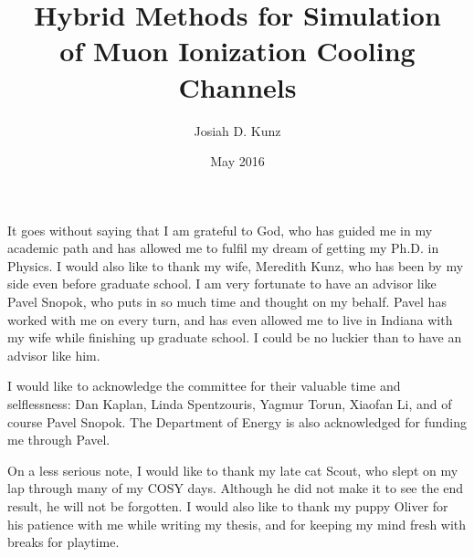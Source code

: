 \title{Hybrid Methods for Simulation\\
of Muon Ionization Cooling Channels}
\author{Josiah D. Kunz}
\date{May 2016}
\copyrightnoticefalse      %
\maketitle                %


\prelimpages         %


\begin{acknowledgement}

It goes without saying that I am grateful to God, who has guided me in my academic path and has allowed me to fulfil my dream of getting my Ph.D. in Physics. I would also like to thank my wife, Meredith Kunz, who has been by my side even before graduate school. I am very fortunate to have an advisor like Pavel Snopok, who puts in so much time and thought on my behalf. Pavel has worked with me on every turn, and has even allowed me to live in Indiana with my wife while finishing up graduate school. I could be no luckier than to have an advisor like him. 

I would like to acknowledge the committee for their valuable time and selflessness: Dan Kaplan, Linda Spentzouris, Yagmur Torun, Xiaofan Li, and of course Pavel Snopok. The Department of Energy is also acknowledged for funding me through Pavel.

On a less serious note, I would like to thank my late cat Scout, who slept on my lap through many of my COSY days. Although he did not make it to see the end result, he will not be forgotten. I would also like to thank my puppy Oliver for his patience with me while writing my thesis, and for keeping my mind fresh with breaks for playtime.

\end{acknowledgement}


\tableofcontents
\clearpage

\listoftables

\clearpage

\listoffigures

\clearpage